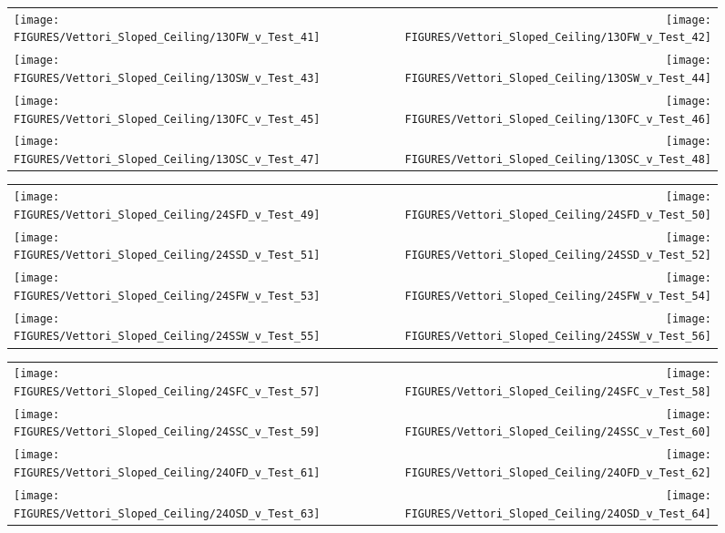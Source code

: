 \begin{figure}[p]
\begin{tabular*}{\textwidth}{l@{\extracolsep{\fill}}r}
\texttt{[image: FIGURES/Vettori\_Sloped\_Ceiling/13OFW\_v\_Test\_41]} &
\texttt{[image: FIGURES/Vettori\_Sloped\_Ceiling/13OFW\_v\_Test\_42]} \\
\texttt{[image: FIGURES/Vettori\_Sloped\_Ceiling/13OSW\_v\_Test\_43]} &
\texttt{[image: FIGURES/Vettori\_Sloped\_Ceiling/13OSW\_v\_Test\_44]} \\
\texttt{[image: FIGURES/Vettori\_Sloped\_Ceiling/13OFC\_v\_Test\_45]} &
\texttt{[image: FIGURES/Vettori\_Sloped\_Ceiling/13OFC\_v\_Test\_46]} \\
\texttt{[image: FIGURES/Vettori\_Sloped\_Ceiling/13OSC\_v\_Test\_47]} &
\texttt{[image: FIGURES/Vettori\_Sloped\_Ceiling/13OSC\_v\_Test\_48]} \\
\end{tabular*}
\label{Vettori_Sloped_6}
\end{figure}

\begin{figure}[p]
\begin{tabular*}{\textwidth}{l@{\extracolsep{\fill}}r}
\texttt{[image: FIGURES/Vettori\_Sloped\_Ceiling/24SFD\_v\_Test\_49]} &
\texttt{[image: FIGURES/Vettori\_Sloped\_Ceiling/24SFD\_v\_Test\_50]} \\
\texttt{[image: FIGURES/Vettori\_Sloped\_Ceiling/24SSD\_v\_Test\_51]} &
\texttt{[image: FIGURES/Vettori\_Sloped\_Ceiling/24SSD\_v\_Test\_52]} \\
\texttt{[image: FIGURES/Vettori\_Sloped\_Ceiling/24SFW\_v\_Test\_53]} &
\texttt{[image: FIGURES/Vettori\_Sloped\_Ceiling/24SFW\_v\_Test\_54]} \\
\texttt{[image: FIGURES/Vettori\_Sloped\_Ceiling/24SSW\_v\_Test\_55]} &
\texttt{[image: FIGURES/Vettori\_Sloped\_Ceiling/24SSW\_v\_Test\_56]} \\
\end{tabular*}
\label{Vettori_Sloped_7}
\end{figure}

\begin{figure}[p]
\begin{tabular*}{\textwidth}{l@{\extracolsep{\fill}}r}
\texttt{[image: FIGURES/Vettori\_Sloped\_Ceiling/24SFC\_v\_Test\_57]} &
\texttt{[image: FIGURES/Vettori\_Sloped\_Ceiling/24SFC\_v\_Test\_58]} \\
\texttt{[image: FIGURES/Vettori\_Sloped\_Ceiling/24SSC\_v\_Test\_59]} &
\texttt{[image: FIGURES/Vettori\_Sloped\_Ceiling/24SSC\_v\_Test\_60]} \\
\texttt{[image: FIGURES/Vettori\_Sloped\_Ceiling/24OFD\_v\_Test\_61]} &
\texttt{[image: FIGURES/Vettori\_Sloped\_Ceiling/24OFD\_v\_Test\_62]} \\
\texttt{[image: FIGURES/Vettori\_Sloped\_Ceiling/24OSD\_v\_Test\_63]} &
\texttt{[image: FIGURES/Vettori\_Sloped\_Ceiling/24OSD\_v\_Test\_64]} \\
\end{tabular*}
\label{Vettori_Sloped_8}
\end{figure}

